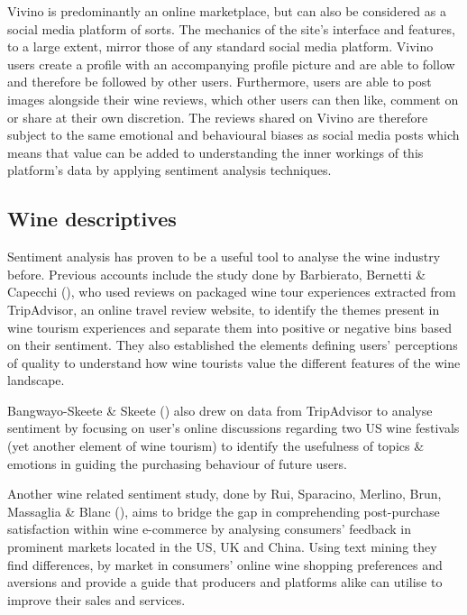 \documentclass[11pt,preprint]{elsarticle}
\numberwithin{equation}{section}
\numberwithin{figure}{section}
\numberwithin{table}{section}
\begin{document}
Vivino is predominantly an online marketplace, but can also be
considered as a social media platform of sorts. The mechanics of the
site's interface and features, to a large extent, mirror those of any
standard social media platform. Vivino users create a profile with an
accompanying profile picture and are able to follow and therefore be
followed by other users. Furthermore, users are able to post images
alongside their wine reviews, which other users can then like, comment
on or share at their own discretion. The reviews shared on Vivino are
therefore subject to the same emotional and behavioural biases as social
media posts which means that value can be added to understanding the
inner workings of this platform's data by applying sentiment analysis
techniques.

\subsection{Wine descriptives}\label{wine-descriptives}

Sentiment analysis has proven to be a useful tool to analyse the wine
industry before. Previous accounts include the study done by Barbierato,
Bernetti \& Capecchi (), who used
reviews on packaged wine tour experiences extracted from TripAdvisor, an
online travel review website, to identify the themes present in wine
tourism experiences and separate them into positive or negative bins
based on their sentiment. They also established the elements defining
users' perceptions of quality to understand how wine tourists value the
different features of the wine landscape.

Bangwayo-Skeete \& Skeete () also drew
on data from TripAdvisor to analyse sentiment by focusing on user's
online discussions regarding two US wine festivals (yet another element
of wine tourism) to identify the usefulness of topics \& emotions in
guiding the purchasing behaviour of future users.

Another wine related sentiment study, done by Rui, Sparacino, Merlino,
Brun, Massaglia \& Blanc (), aims to
bridge the gap in comprehending post-purchase satisfaction within wine
e-commerce by analysing consumers' feedback in prominent markets located
in the US, UK and China. Using text mining they find differences, by
market in consumers' online wine shopping preferences and aversions and
provide a guide that producers and platforms alike can utilise to
improve their sales and services.
\end{document}
